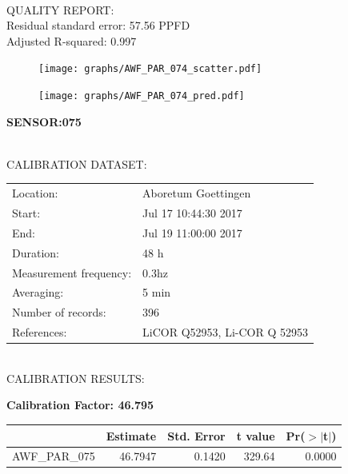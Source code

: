 \documentclass[oneside]{report}
\begin{document}
\hrulefill\\
QUALITY REPORT:\\
Residual standard error: 57.56 PPFD\\
Adjusted R-squared: 0.997



\begin{figure}[H]
  \centering
  \texttt{[image: graphs/AWF\_PAR\_074\_scatter.pdf]}
\end{figure}




\begin{figure}[H]
  \centering
  \texttt{[image: graphs/AWF\_PAR\_074\_pred.pdf]}
\end{figure}

\pagebreak


\begin{center}
\large{\textbf{SENSOR:075}}\\
\end{center}

\hrulefill\\
CALIBRATION DATASET:\\
\begin{table}[h!]
  \centering
  \label{tab:table1}
  \begin{tabular}{ll}
    Location: & Aboretum Goettingen\\ 
    
    
    Start:  & Jul 17 10:44:30 2017 \\
    End:   & Jul 19 11:00:00 2017\\ 
    Duration: & 48 h\\
    Measurement frequency: & 0.3hz\\
    Averaging:  &5 min\\
    Number of records: & 396 \\
    References: & LiCOR Q52953, Li-COR Q 52953 \\
  \end{tabular}
\end{table}

\hrulefill\\
CALIBRATION RESULTS:\\


\begin{center}
\textbf{\large{Calibration Factor: 46.795}}\\
\end{center}
\begin{table}[ht]
\centering
\begin{tabular}{rrrrr}
  \hline
 & Estimate & Std. Error & t value & Pr($>$$|$t$|$) \\ 
  \hline
AWF\_PAR\_075 & 46.7947 & 0.1420 & 329.64 & 0.0000 \\ 
   \hline
\end{tabular}
\end{table}
\end{document}
